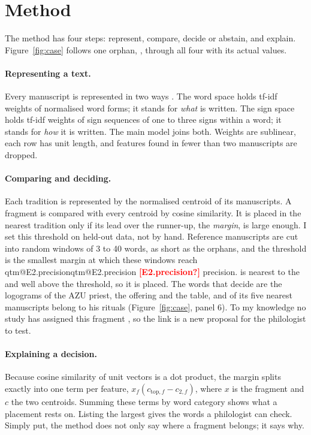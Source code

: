 \documentclass[11pt]{article}
\makeatletter
\newcommand{\Q}[1]{\ifcsname qtm@#1\endcsname\csname qtm@#1\endcsname\else
  \textbf{\textcolor{red}{[#1?]}}\PackageWarning{qtm}{Undefined number #1}\fi}
\newcommand{\term}[1]{\textit{#1}}
\makeatother
\begin{document}
\section{Method}
\label{sec:method}

The method has four steps: represent, compare, decide or abstain, and explain.
Figure~\ref{fig:case} follows one orphan, , through all four with its actual values.

\paragraph{Representing a text.}
Every manuscript is represented in two ways \citep{salton1988weighting}. The word space holds
tf-idf weights of normalised word forms; it stands for \term{what} is written. The sign space holds
tf-idf weights of sign sequences of one to three signs within a word; it stands for \term{how} it is
written. The main model joins both. Weights are sublinear, each row has unit length, and features
found in fewer than two manuscripts are dropped.

\paragraph{Comparing and deciding.}
Each tradition is represented by the normalised centroid of its manuscripts. A fragment is
compared with every centroid by cosine similarity. It is placed in the nearest tradition only if
its lead over the runner-up, the \term{margin}, is large enough. I set this threshold on held-out
data, not by hand. Reference manuscripts are cut into random windows of 3 to 40 words, as short as
the orphans, and the threshold is the smallest margin at which these windows reach
\Q{E2.precision} precision.  is nearest to the  and well above the threshold,
so it is placed. The words that decide are the logograms of the AZU priest, the offering and the
table, and  of its five nearest manuscripts belong to his rituals
(Figure~\ref{fig:case}, panel 6). To my knowledge no study has assigned this fragment
\citep[46f.]{roszkowska2007kbo44}, so the link is a new proposal for the philologist to test.

\paragraph{Explaining a decision.}
Because cosine similarity of unit vectors is a dot product, the margin splits exactly into one term
per feature, $x_f(c_{\mathrm{top},f}-c_{2,f})$, where $x$ is the fragment and $c$ the two
centroids. Summing these terms by word category shows what a placement rests on. Listing the
largest gives the words a philologist can check. Simply put, the method does not only say where a
fragment belongs; it says why.
\end{document}
